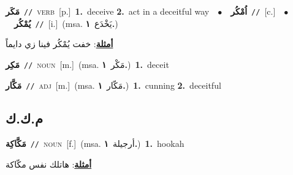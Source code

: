 \documentclass[10pt,a4paper,twoside]{article} %
\begin{document}
\begin{multicols}{2}
{\setlength\topsep{0pt}\textbf{\foreignlanguage{arabic}{مَكَر}}\ {\color{gray}\texttt{//}\color{black}}\ \textsc{verb}\ [p.]\ \textbf{1.}~deceive  \textbf{2.}~act in a deceitful way\ \ $\bullet$\ \ \setlength\topsep{0pt}\textbf{\foreignlanguage{arabic}{اُمْكُر}}\ {\color{gray}\texttt{//}\color{black}}\ [c.]\ \ $\bullet$\ \ \setlength\topsep{0pt}\textbf{\foreignlanguage{arabic}{يُمْكُر}}\ {\color{gray}\texttt{//}\color{black}}\ [i.]\ \color{gray}(msa. \foreignlanguage{arabic}{يَخْدَع}~\foreignlanguage{arabic}{\textbf{١.}})\color{black}\  \begin{flushright}\color{gray}\foreignlanguage{arabic}{\textbf{\underline{\foreignlanguage{arabic}{أمثلة}}}: خفت يُمْكُر فينا زي دايماً}\end{flushright}\color{black}} \vspace{2mm}

{\setlength\topsep{0pt}\textbf{\foreignlanguage{arabic}{مَكِر}}\ {\color{gray}\texttt{//}\color{black}}\ \textsc{noun}\ [m.]\ \color{gray}(msa. \foreignlanguage{arabic}{مَكْر}~\foreignlanguage{arabic}{\textbf{١.}})\color{black}\ \textbf{1.}~deceit\ } \vspace{2mm}

{\setlength\topsep{0pt}\textbf{\foreignlanguage{arabic}{مَكَّار}}\ {\color{gray}\texttt{//}\color{black}}\ \textsc{adj}\ [m.]\ \color{gray}(msa. \foreignlanguage{arabic}{مَكّار}~\foreignlanguage{arabic}{\textbf{١.}})\color{black}\ \textbf{1.}~cunning  \textbf{2.}~deceitful\ } \vspace{2mm}

\vspace{-3mm}
\subsection*{\color{blue}\foreignlanguage{arabic}{م.ك.ك}\color{blue}{}} 

{\setlength\topsep{0pt}\textbf{\foreignlanguage{arabic}{مَكَّاكِة}}\ {\color{gray}\texttt{//}\color{black}}\ \textsc{noun}\ [f.]\ \color{gray}(msa. \foreignlanguage{arabic}{أرجيلة}~\foreignlanguage{arabic}{\textbf{١.}})\color{black}\ \textbf{1.}~hookah\  \begin{flushright}\color{gray}\foreignlanguage{arabic}{\textbf{\underline{\foreignlanguage{arabic}{أمثلة}}}: هاتلك نفس مكّاكة}\end{flushright}\color{black}} \vspace{2mm}


\end{multicols}
\end{document}
